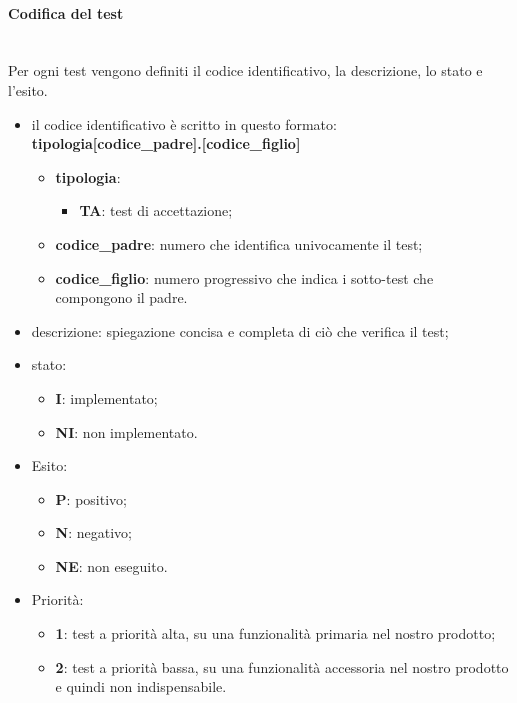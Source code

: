 			\paragraph*{Codifica del test} \mbox{}\\ [1mm]
			Per ogni test vengono definiti il codice identificativo, la descrizione, lo stato e l'esito.
			\begin{itemize}
				\item il codice identificativo è scritto in questo formato:\\
				\textbf{tipologia[codice\_padre].[codice\_figlio]}
				\begin{itemize}
					\item \textbf{tipologia}:
					\begin{itemize}
						\item \textbf{TA}: test di accettazione;
					\end{itemize}
					\item \textbf{codice\_padre}: numero che identifica univocamente il test;
					\item \textbf{codice\_figlio}: numero progressivo che indica i sotto-test che compongono il padre. 
				\end{itemize}
				\item descrizione: spiegazione concisa e completa di ciò che verifica il test;
				\item stato:
				\begin{itemize}
					\item \textbf{I}: implementato;
					\item \textbf{NI}: non implementato.
				\end{itemize}
				\item Esito:
				\begin{itemize}
					\item \textbf{P}: positivo;
					\item \textbf{N}: negativo;
					\item \textbf{NE}: non eseguito.
				\end{itemize}
				\item Priorità:
				\begin{itemize}
					\item \textbf{1}: test a priorità alta, su una funzionalità primaria nel nostro prodotto;
					\item \textbf{2}: test a priorità bassa, su una funzionalità accessoria nel nostro prodotto e quindi non indispensabile.
				\end{itemize}
			\end{itemize}
